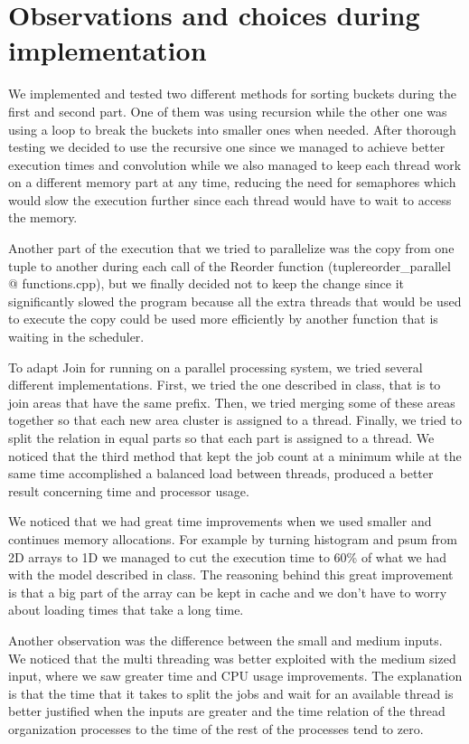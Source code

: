 \documentclass{ws-ijprai}
\begin{document}
\clearpage
\section{Observations and choices during implementation}

\tab We implemented and tested two different methods for sorting buckets during the first and second part. One of them was using recursion while the other one was using a loop to break the buckets into smaller ones when needed. After thorough testing we decided to use the recursive one since we managed to achieve better execution times and convolution while we also managed to keep each thread work on a different memory part at any time, reducing the need for semaphores which would slow the execution further since each thread would have to wait to access the memory.

\tab Another part of the execution that we tried to parallelize was the copy from one tuple to another during each call of the Reorder function (tuplereorder\_parallel @ functions.cpp), but we finally decided not to keep the change since it significantly slowed the program because all the extra threads that would be used to execute the copy could be used more efficiently by another function that is waiting in the scheduler.

\tab To adapt Join for running on a parallel processing system, we tried several different implementations. First, we tried the one described in class, that is to join areas that have the same prefix. Then, we tried merging some of these areas together so that each new area cluster is assigned to a thread. Finally, we tried to split the relation in equal parts so that each part is assigned to a thread. We noticed that the third method that kept the job count at a minimum while at the same time accomplished a balanced load between threads, produced a better result concerning time and processor usage.

\tab We noticed that we had great time improvements when we used smaller and continues memory allocations. For example by turning histogram and psum from 2D arrays to 1D we managed to cut the execution time to 60\% of what we had with the model described in class. The reasoning behind this great improvement is that a big part of the array can be kept in cache and we don't have to worry about loading times that take a long time.

\tab Another observation was the difference between the small and medium inputs. We noticed that the multi threading was better exploited with the medium sized input, where we saw greater time and CPU usage improvements. The explanation is that the time that it takes to split the jobs and wait for an available thread is better justified when the inputs are greater and the time relation of the thread organization processes to the time of the rest of the processes tend to zero.
\end{document}

